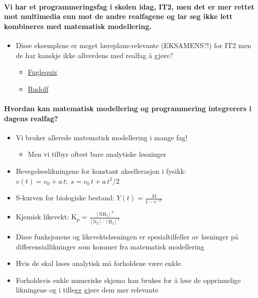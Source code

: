 \documentclass[%
oneside,                 %
final,                   %
10pt]{article}
\begin{document}

\paragraph{Vi har et programmeringsfag i skolen idag, IT2, men det er mer rettet mot multimedia enn mot de andre realfagene og lar seg ikke lett kombineres med matematisk modellering.}
\begin{itemize}
\item Disse eksemplene er meget læreplans-relevante (EKSAMENS?!) for IT2 men de har kanskje ikke allverdens med realfag å gjøre?
\begin{itemize}

 \item \href{{kode/fugler.html}}{Fuglequiz}

 \item \href{{kode/oppgaver_animasjon_9.html}}{Rudolf}
\end{itemize}

\noindent
\end{itemize}

\noindent

\paragraph{Hvordan kan matematisk modellering og programmering integrerers i dagens realfag?}
\begin{itemize}
\item Vi bruker allerede matematisk modellering i mange fag!
\begin{itemize}

 \item Men vi tilbyr oftest bare analytiske løsninger
\end{itemize}

\noindent
\end{itemize}

\noindent
\begin{itemize}
\item Bevegelseslikningene for konstant aksellerasjon i fysikk: $v(t)= v_0 + a\,t;\; s = v_0\,t + a\,t^2/2$

\item S-kurven for biologiske bestand: $Y(t)= \frac{M}{1-e^{-rt}}$

\item Kjemisk likevekt: $\mathrm{K_p=\frac{[NH_3]^2}{[N_2]\cdot[H_2]^3}}$

\item Disse funksjonene og likevektsløsningen er spesialtilfeller av løsninger på differensiallikninger som kommer fra matematisk modellering

\item Hvis de skal løses analytisk må forholdene være enkle.

\item Forholdsvis enkle numeriske skjema kan brukes for å løse de opprinnelige likningene og i tillegg gjøre dem mer relevante
\end{itemize}
\end{document}
